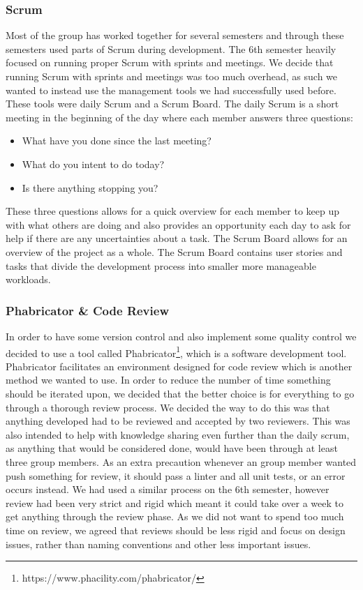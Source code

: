 \subsubsection{Scrum}
Most of the group has worked together for several semesters and through these semesters used parts of Scrum during development.
The 6th semester heavily focused on running proper Scrum with sprints and meetings.
We decide that running Scrum with sprints and meetings was too much overhead, as such we wanted to instead use the management tools we had successfully used before.
These tools were daily Scrum and a Scrum Board.
The daily Scrum is a short meeting in the beginning of the day where each member answers three questions:
\begin{itemize}
    \item What have you done since the last meeting? 
    \item What do you intent to do today?
    \item Is there anything stopping you?
\end{itemize}
These three questions allows for a quick overview for each member to keep up with what others are doing and also provides an opportunity each day to ask for help if there are any uncertainties about a task.
The Scrum Board allows for an overview of the project as a whole.
The Scrum Board contains user stories and tasks that divide the development process into smaller more manageable workloads.
\subsubsection{Phabricator \& Code Review}
In order to have some version control and also implement some quality control we decided to use a tool called Phabricator\footnote{https://www.phacility.com/phabricator/}, which is a software development tool.
Phabricator facilitates an environment designed for code review which is another method we wanted to use.
In order to reduce the number of time something should be iterated upon, we decided that the better choice is for everything to go through a thorough review process.
We decided the way to do this was that anything developed had to be reviewed and accepted by two reviewers.
This was also intended to help with knowledge sharing even further than the daily scrum, as anything that would be considered done, would have been through at least three group members.
As an extra precaution whenever an group member wanted push something for review, it should pass a linter and all unit tests, or an error occurs instead.
We had used a similar process on the 6th semester, however review had been very strict and rigid which meant it could take over a week to get anything through the review phase.
As we did not want to spend too much time on review, we agreed that reviews should be less rigid and focus on design issues, rather than naming conventions and other less important issues.
